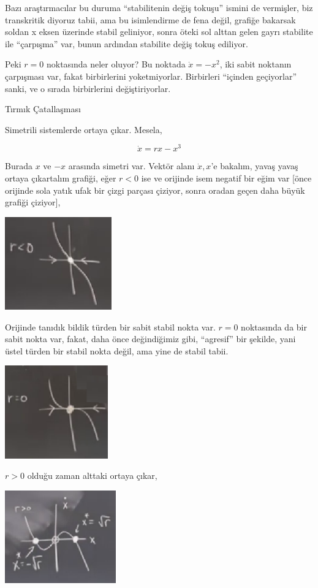 \documentclass[12pt,fleqn]{article}\usepackage{../../common}
\begin{document}
Bazı araştırmacılar bu duruma ``stabilitenin değiş tokuşu'' ismini de vermişler,
biz transkritik diyoruz tabii, ama bu isimlendirme de fena değil, grafiğe
bakarsak soldan x eksen üzerinde stabil geliniyor, sonra öteki sol alttan gelen
gayrı stabilite ile ``çarpışma'' var, bunun ardından stabilite değiş tokuş
ediliyor. 

Peki $r=0$ noktasında neler oluyor? Bu noktada $\dot{x}=-x^2$, iki sabit
noktanın çarpışması var, fakat birbirlerini yoketmiyorlar. Birbirleri ``içinden
geçiyorlar'' sanki, ve o sırada birbirlerini değiştiriyorlar. 

Tırmık Çatallaşması

Simetrili sistemlerde ortaya çıkar. Mesela,

$$ \dot{x} = rx - x^3 $$

Burada $x$ ve $-x$ arasında simetri var. Vektör alanı $\dot{x},x$'e bakalım,
yavaş yavaş ortaya çıkartalım grafiği, eğer $r<0$ ise ve orijinde isem negatif
bir eğim var [önce orijinde sola yatık ufak bir çizgi parçası çiziyor, sonra
oradan geçen daha büyük grafiği çiziyor], 

\includegraphics[height=4cm]{02_19.png}

Orijinde tanıdık bildik türden bir sabit stabil nokta var. $r=0$ noktasında da
bir sabit nokta var, fakat, daha önce değindiğimiz gibi, ``agresif'' bir
şekilde, yani üstel türden bir stabil nokta değil, ama yine de stabil tabii. 

\includegraphics[height=4cm]{02_20.png}

$r>0$ olduğu zaman alttaki ortaya çıkar, 

\includegraphics[height=4cm]{02_21.png}
\end{document}
